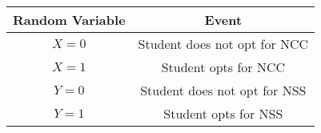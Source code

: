 \begin{tabular}[12pt]{ |c| c|} 
    \hline
    {Random Variable } & {Event}\\ 
    \hline
    $ X = 0 $ &  Student does not opt for NCC \\
    \hline 
    $ X = 1 $ & Student opts for NCC\\
    \hline
    $ Y = 0 $ & Student does not opt for NSS\\
    \hline   
    $ Y = 1 $ & Student opts for NSS \\
    \hline
\end{tabular}
